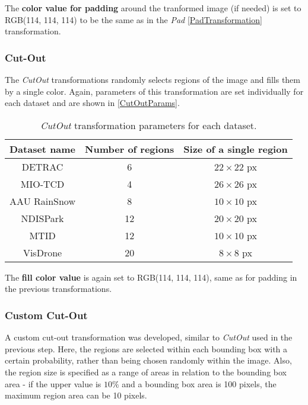 The \textbf{color value for padding} around the tranformed image (if needed)
is set to RGB(114, 114, 114) to be the same as in the \textit{Pad} \ref{PadTransformation} transformation.

\subsubsection*{Cut-Out}

The \textit{CutOut} transformations randomly selects regions of the image and fills them by a single color. Again,
parameters of this transformation are set individually for each dataset and are shown in \autoref{CutOutParams}.

\begin{table}[h]
\centering
\begin{tabular}{|c|c|c|}
    \hline
    Dataset name & Number of regions & Size of a single region \\
    \hline
    DETRAC       &  6 & $22 \times 22$ px \\
    MIO-TCD      &  4 & $26 \times 26$ px \\
    AAU RainSnow &  8 & $10 \times 10$ px \\
    NDISPark     & 12 & $20 \times 20$ px \\
    MTID         & 12 & $10 \times 10$ px \\
    VisDrone     & 20 & $8 \times 8$ px \\
    \hline
\end{tabular}
\caption{\textit{CutOut} transformation parameters for each dataset.}
\label{CutOutParams}
\end{table}

The \textbf{fill color value} is again set to RGB(114, 114, 114), same as for
padding in the previous transformations.

\subsubsection*{Custom Cut-Out}

A custom cut-out transformation was developed, similar to \textit{CutOut} used
in the previous step. Here, the regions are selected within each bounding box
with a certain probability, rather than being chosen randomly within the image.
Also, the region size is specified as a range of areas in relation to the
bounding box area - if the upper value is $10\%$ and a bounding box area is 100
pixels, the maximum region area can be 10 pixels.

